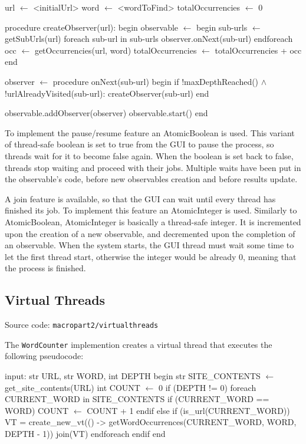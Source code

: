 \documentclass[12pt, a4paper]{report}
\begin{document}
\begin{algorithm}[label={alg4}]
url $\gets$ <initialUrl>
word $\gets$ <wordToFind>
totalOccurrencies $\gets$ 0

procedure createObserver(url):
    begin
        observable $\gets$ 
            begin
                sub-urls $\gets$ getSubUrls(url)
                foreach sub-url in sub-urls
                    observer.onNext(sub-url)
                endforeach
                occ $\gets$ getOccurrencies(url, word)
                totalOccurrencies $\gets$ totalOccurrencies + occ
            end
        
        observer $\gets$
            procedure onNext(sub-url)
                begin
                    if !maxDepthReached() $\wedge$ !urlAlreadyVisited(sub-url):
                        createObserver(sub-url)
                end

        observable.addObserver(observer)
        observable.start()
    end
\end{algorithm}

To implement the pause/resume feature an AtomicBoolean is used.
This variant of thread-safe boolean is set to true from the GUI to pause the process, so threads wait for it to become false again.
When the boolean is set back to false, threads stop waiting and proceed with their jobs.
Multiple waits have been put in the observable's code, before new observables creation and before results update.

A join feature is available, so that the GUI can wait until every thread has finished its job.
To implement this feature an AtomicInteger is used.
Similarly to AtomicBoolean, AtomicInteger is basically a thread-safe integer. It is incremented upon the creation of a new observable, and decremented upon the completion of an observable.
When the system starts, the GUI thread must wait some time to let the first thread start, otherwise the integer would be already 0, meaning that the process is finished.

\subsection{Virtual Threads}
Source code: \texttt{macropart2/virtualthreads}

The \texttt{WordCounter} implemention creates a virtual thread that executes the following pseudocode:

\newpage

\begin{algorithm}[label={alg5}]
input: str URL, str WORD, int DEPTH
begin
    str SITE_CONTENTS $\gets$ get_site_contents(URL)
    int COUNT $\gets$ 0
    if (DEPTH != 0)
        foreach CURRENT_WORD in SITE_CONTENTS
            if (CURRENT_WORD == WORD)
                COUNT $\gets$ COUNT + 1
            endif
            else if (is_url(CURRENT_WORD))
                VT = create_new_vt(() -> 
                    getWordOccurrences(CURRENT_WORD, WORD, DEPTH - 1))
                join(VT)
        endforeach
    endif
end       
\end{algorithm}
\end{document}
